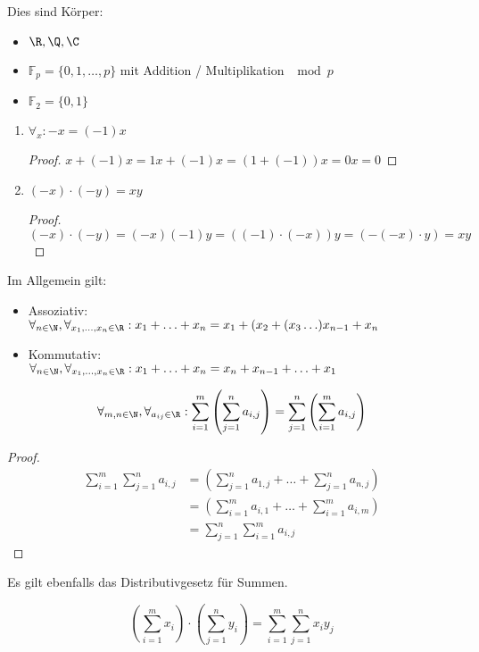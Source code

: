 \begin{example}
	Dies sind Körper:
\begin{itemize} 
	\item $\R, \Q, \C$
	\item $\mathbb{F}_p = \{0,1,\ldots,p\} $ mit Addition / Multiplikation $\mod p$ 
	\item $\mathbb{F}_2 = \{0,1\}$
\end{itemize}
\end{example}
\begin{enumerate}[resume]
	\item $\forall_{x}: -x = (-1)x $
		\begin{proof}
		$x+(-1)x=1x+(-1)x=(1+(-1))x=0x=0$ 
		\end{proof}
	\item $(-x)\cdot (-y) = xy$
		\begin{proof}
			$(-x)\cdot (-y) = (-x)(-1)y= ((-1)\cdot (-x))y=(-(-x)\cdot y)=xy$ 
		\end{proof}
\end{enumerate}
Im Allgemein gilt:
\begin{itemize}
	\item Assoziativ: \\
		$\forall_{n \in \N}, \forall_{x_1,\ldots,x_{n} \in \R} : x_1+\ldots+x_{n} = x_1+ (x_2 +(x_3\ldots)x_{n-1} + x_{n}$
	\item Kommutativ: \\
		$\forall_{n \in  \N}, \forall_{x_1,\ldots,x_{n} \in \R} : x_1+\ldots+x_{n}= x_{n}+x_{n-1}+ \ldots + x_1$
\end{itemize}
\begin{theorem}[Doppelsummen]
\[
	\forall_{m,n \in  \N}, \forall_{a_{ij} \in  \R}: \sum_{i=1}^{m} \left( \sum_{j=1}^{n}a_{i,j} \right) = \sum_{j=1}^{n} \left( \sum_{i=1}^{m}a_{i,j} \right)
\]
\end{theorem}
\begin{proof}
	\begin{align*}
	\sum_{i=1}^{m}\sum_{j=1}^{n}a_{i,j} &= \left( \sum_{j=1}^{n}a_{1,j} + \ldots + \sum_{j=1}^{n}a_{n,j} \right) \\
					    &= \left( \sum_{i=1}^{m}a_{i,1} + \ldots + \sum_{i=1}^{m}a_{i,m} \right) \\
					    &=\sum_{j=1}^{n}\sum_{i=1}^{m}a_{i,j}
\end{align*}
\end{proof}
Es gilt ebenfalls das Distributivgesetz für Summen.
\begin{theorem}[Distributiv]
	\[
		\left( \sum_{i=1}^{m}x_i \right) \cdot \left(\sum_{j=1}^{n}y_{i} \right) = \sum_{i=1}^{m}\sum_{j=1}^{n}x_{i}y_{j}
\]
\end{theorem}
